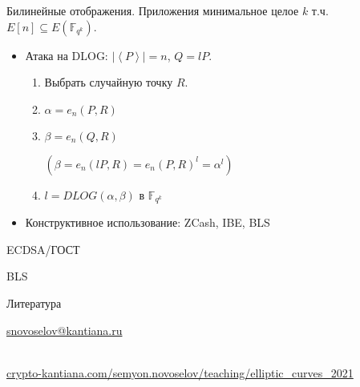 \documentclass{beamer}
\begin{document}
\begin{frame}{Билинейные отображения. Приложения}
 минимальное целое $k$ т.ч. $E[n] \subseteq E(\mathbb{F}_{q^k})$.

\begin{itemize}
    \item Атака на DLOG: $|\left<P\right>| = n$, $Q = l P$.
    \begin{enumerate}
        \item Выбрать случайную точку $R$.
        \item $\alpha = e_n(P, R)$
        \item $\beta  = e_n(Q, R)$ \hfill 
        \begin{scriptsize}
        $(\beta = e_n(l P, R) = e_n(P, R)^l = \alpha^l)$
        \end{scriptsize}
        \item $l = DLOG(\alpha, \beta)$ в $\mathbb{F}_{q^k}$
    \end{enumerate}    
    \item Конструктивное использование: ZCash, IBE, BLS
\end{itemize}
\end{frame}

\begin{frame}{ECDSA/ГОСТ}
\end{frame}

\begin{frame}{BLS}
\end{frame}

\begin{frame}{Литература}
\nocite{Menezes1993}\nocite{Blake1999}\nocite{Washington2008}

\printbibliography


\begin{center}
    \begin{tcolorbox}[enhanced,hbox,colback=block-green-color-bg,colframe=subsection-color!120,title=Контакты,center title]
        \begin{varwidth}{\textwidth}
            \begin{center}
                \href{mailto:snovoselov@kantiana.ru}{snovoselov@kantiana.ru}
            \end{center}
        \end{varwidth}
    \end{tcolorbox}	
\end{center}

\\
{\footnotesize
    \href{https://crypto-kantiana.com/semyon.novoselov/teaching/elliptic_curves_2021}{crypto-kantiana.com/semyon.novoselov/teaching/elliptic\_curves\_2021}
}
\end{frame}
\end{document}
